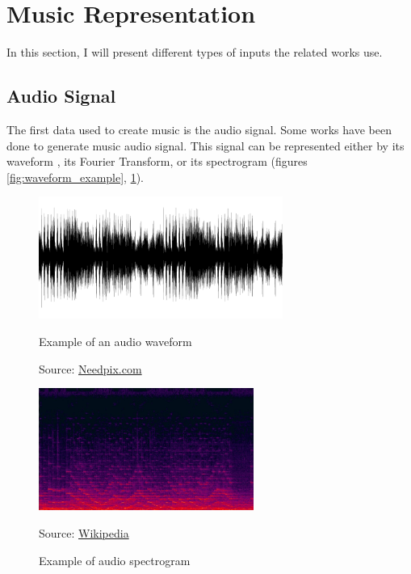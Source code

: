\documentclass[12pt]{report}
\begin{document}

\section{Music Representation}

In this section, I will present different types of inputs the related works use.

\subsection{Audio Signal} 

The first data used to create music is the audio signal. Some works \cite{oord_wavenet:_2016, dieleman_challenge_2018, donahue_adversarial_2019, kalchbrenner_efficient_2018, mehri_samplernn_2017, lu_play_2018} have been done to generate music audio signal.
This signal can be represented either by its waveform \cite{oord_wavenet:_2016}, its Fourier Transform, or its spectrogram (figures \ref{fig:waveform_example}, \ref{fig:spectrogram_example}).

\begin{figure}[H]
   \begin{minipage}{0.5\textwidth}
     \centering
     \includegraphics[width=.9\linewidth, height=4cm]{images/music/waveform/waveform.png}
     \caption{Example of an audio waveform}
     Source: \href{https://www.needpix.com/photo/856116/audio-aural-ear-hearing-music-musical-recording-silhouette-sonic}{Needpix.com}
     \label{fig:waveform_example}
   \end{minipage}\hfill
   \begin{minipage}{0.5\textwidth}
     \centering
     \includegraphics[width=\linewidth, height=4cm]{images/music/spectrogram/spectrogram.jpg}
     \caption{Example of audio spectrogram}
     Source: \href{https://commons.wikimedia.org/wiki/File:Spectrogram_of_Bach\%27s_Chorales_for_Organ.jpg}{Wikipedia}
     \label{fig:spectrogram_example}
   \end{minipage}
\end{figure}
\end{document}
